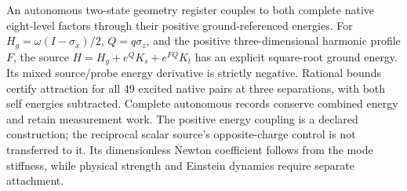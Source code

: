 An autonomous two-state geometry register couples to both complete native
eight-level factors through their positive ground-referenced energies.
For \(H_g=\omega(I-\sigma_x)/2\), \(Q=q\sigma_z\), and the positive
three-dimensional harmonic profile \(F\), the source
\(H=H_g+e^QK_s+e^{FQ}K_t\) has an explicit square-root ground energy.
Its mixed source/probe energy derivative is strictly negative.
Rational bounds certify attraction for all 49 excited native pairs at
three separations, with both self energies subtracted. Complete autonomous
records conserve combined energy and retain measurement work.
The positive energy coupling is a declared construction; the reciprocal
scalar source's opposite-charge control is not transferred to it.
Its dimensionless Newton coefficient follows from the mode stiffness,
while physical strength and Einstein dynamics require separate attachment.
